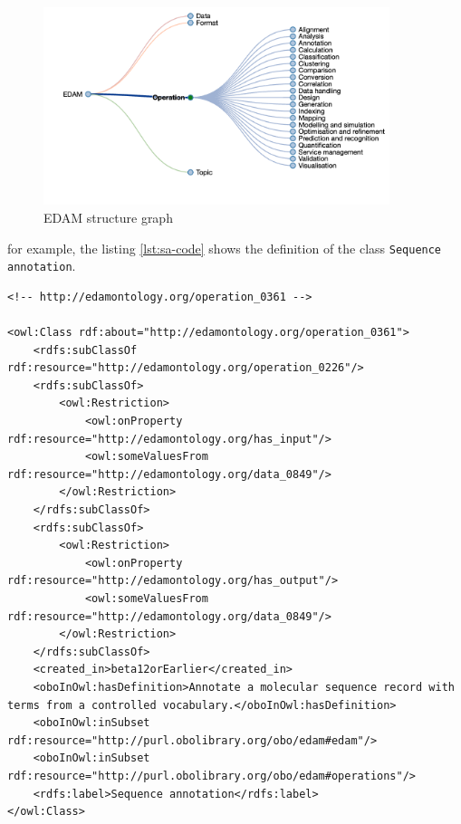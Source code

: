 \documentclass{scrartcl}
\begin{document}
\begin{figure}[h!]
  \centering
  \includegraphics[width=0.9\textwidth]{imgs/edam-structure-graph.png}
  \caption{EDAM structure graph}
  \label{fig:graph}
\end{figure}



for example, 
  the listing \ref{lst:sa-code} shows the definition of the class 
  \texttt{Sequence annotation}.



\begin{lstlisting}[caption={Sequence annotation operation definition}, captionpos=b, label={lst:sa-code}]
<!-- http://edamontology.org/operation_0361 -->

<owl:Class rdf:about="http://edamontology.org/operation_0361">
    <rdfs:subClassOf rdf:resource="http://edamontology.org/operation_0226"/>
    <rdfs:subClassOf>
        <owl:Restriction>
            <owl:onProperty rdf:resource="http://edamontology.org/has_input"/>
            <owl:someValuesFrom rdf:resource="http://edamontology.org/data_0849"/>
        </owl:Restriction>
    </rdfs:subClassOf>
    <rdfs:subClassOf>
        <owl:Restriction>
            <owl:onProperty rdf:resource="http://edamontology.org/has_output"/>
            <owl:someValuesFrom rdf:resource="http://edamontology.org/data_0849"/>
        </owl:Restriction>
    </rdfs:subClassOf>
    <created_in>beta12orEarlier</created_in>
    <oboInOwl:hasDefinition>Annotate a molecular sequence record with terms from a controlled vocabulary.</oboInOwl:hasDefinition>
    <oboInOwl:inSubset rdf:resource="http://purl.obolibrary.org/obo/edam#edam"/>
    <oboInOwl:inSubset rdf:resource="http://purl.obolibrary.org/obo/edam#operations"/>
    <rdfs:label>Sequence annotation</rdfs:label>
</owl:Class>
\end{lstlisting}
\end{document}
